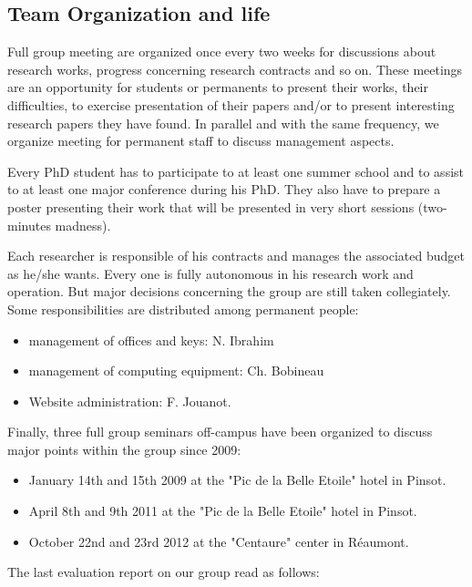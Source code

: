 
\subsection{Team Organization and life} %
\label{sub:hadas_team_organization_and_life}%


Full group meeting are organized once every two weeks for discussions about research works, progress concerning research contracts and so on. These meetings are an opportunity for students or permanents to present their works, their difficulties, to exercise presentation of their papers and/or to present interesting research papers they have found.
In parallel and with the same frequency, we organize meeting for permanent staff to discuss management aspects.

Every PhD student has to participate to at least one summer school and to assist to at least one major conference during his PhD. They also have to prepare a poster presenting their work that will be presented in very short sessions (two-minutes madness).

Each researcher is responsible of his contracts and manages the associated budget as he/she wants. Every one is fully autonomous in his research work and operation. But major decisions concerning the group are still taken collegiately. Some responsibilities are distributed among permanent people:
\begin{itemize}
\setlength{\itemsep}{-0.1cm}
\item management of offices and keys: N. Ibrahim
\item management of computing equipment: Ch. Bobineau
\item Website administration: F. Jouanot.
\end{itemize}
\noindent Finally, three full group seminars off-campus have been organized to discuss major points within the group since 2009:
\begin{itemize}
\setlength{\itemsep}{-0.1cm}
\item January 14th and 15th 2009 at the "Pic de la Belle Etoile" hotel in Pinsot.
\item April 8th and 9th 2011 at the "Pic de la Belle Etoile" hotel in Pinsot.
\item October 22nd and 23rd 2012 at the "Centaure" center in Réaumont.
\end{itemize}
\noindent The last evaluation report on our group read as follows: 

